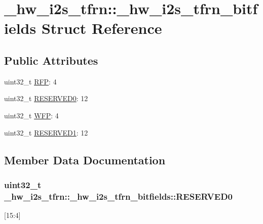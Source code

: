 \hypertarget{struct__hw__i2s__tfrn_1_1__hw__i2s__tfrn__bitfields}{}\section{\+\_\+hw\+\_\+i2s\+\_\+tfrn\+:\+:\+\_\+hw\+\_\+i2s\+\_\+tfrn\+\_\+bitfields Struct Reference}
\label{struct__hw__i2s__tfrn_1_1__hw__i2s__tfrn__bitfields}
\subsection*{Public Attributes}
\begin{DoxyCompactItemize}
\item 
uint32\+\_\+t \hyperlink{struct__hw__i2s__tfrn_1_1__hw__i2s__tfrn__bitfields_a8fcdbf4b6426c71828e7591bc00557e2}{R\+FP}\+: 4
\item 
uint32\+\_\+t \hyperlink{struct__hw__i2s__tfrn_1_1__hw__i2s__tfrn__bitfields_a968cc6fb4b54cfb7bf48762307bdeffc}{R\+E\+S\+E\+R\+V\+E\+D0}\+: 12
\item 
uint32\+\_\+t \hyperlink{struct__hw__i2s__tfrn_1_1__hw__i2s__tfrn__bitfields_a0a1be7deddeb937e74c3e323c294a9eb}{W\+FP}\+: 4
\item 
uint32\+\_\+t \hyperlink{struct__hw__i2s__tfrn_1_1__hw__i2s__tfrn__bitfields_a736d6161c17a6aea196c00676783e588}{R\+E\+S\+E\+R\+V\+E\+D1}\+: 12
\end{DoxyCompactItemize}


\subsection{Member Data Documentation}
\subsubsection[{\texorpdfstring{R\+E\+S\+E\+R\+V\+E\+D0}{RESERVED0}}]{\setlength{\rightskip}{0pt plus 5cm}uint32\+\_\+t \+\_\+hw\+\_\+i2s\+\_\+tfrn\+::\+\_\+hw\+\_\+i2s\+\_\+tfrn\+\_\+bitfields\+::\+R\+E\+S\+E\+R\+V\+E\+D0}\hypertarget{struct__hw__i2s__tfrn_1_1__hw__i2s__tfrn__bitfields_a968cc6fb4b54cfb7bf48762307bdeffc}{}\label{struct__hw__i2s__tfrn_1_1__hw__i2s__tfrn__bitfields_a968cc6fb4b54cfb7bf48762307bdeffc}
\mbox{[}15\+:4\mbox{]} 
